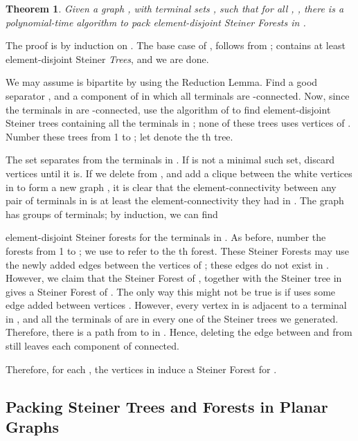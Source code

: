 \documentclass[11pt]{article}
\newtheorem{theorem}[lemma]{Theorem}
\renewenvironment{proof}{\vspace{-0.1in}\noindent{\bf Proof:}}{\hspace*{\fill}\par}
\begin{document}
\begin{theorem}
  \label{thm:packGeneral}
 Given a graph , with terminal sets , such that for all , , there is a
  polynomial-time algorithm to pack 
  element-disjoint Steiner Forests in .
\end{theorem}
\begin{proof}
  The proof is by induction on . The base case of , follows
  from \cite{cs,CalinescuCV07};  contains at least 
  element-disjoint Steiner \emph{Trees}, and we are done.

  We may assume  is bipartite by using the Reduction Lemma. Find a
  good separator , and a component  of  in which all
  terminals are -connected.  Now, since the
  terminals in  are -connected, use the
  algorithm of \cite{cs} to find 
  element-disjoint Steiner trees containing all the terminals in
  ; none of these trees uses vertices of .  Number these
  trees from 1 to ; let 
  denote the th tree.

  The set  separates  from the terminals in . If  is not a minimal such set, discard vertices until it
  is. If we delete  from , and add a clique between the
  white vertices in  to form a new graph , it is clear that the
  element-connectivity between any pair of terminals in  is at
  least the element-connectivity they had in .  The graph  has
   groups of terminals; by induction, we can find
  
  element-disjoint Steiner forests for the terminals in . As
  before, number the forests from 1 to ;
  we use  to refer to the th forest. These Steiner
  Forests may use the newly added edges between the vertices of ;
  these edges do not exist in .  However, we claim that the Steiner
  Forest  of , together with the Steiner tree
   in  gives a Steiner Forest of . The only
  way this might not be true is if  uses some edge added
  between vertices . However, every vertex in  is
  adjacent to a terminal in , and all the terminals of
   are in every one of the Steiner trees we
  generated. Therefore, there is a path from  to  in
  . Hence, deleting the edge between  and  from
   still leaves each component of  connected.

  Therefore, for each , the
  vertices in  induce a Steiner Forest
  for .
\end{proof}

\subsection{Packing Steiner Trees and Forests in Planar Graphs}
\label{subsec:planarPacking}
\end{document}
